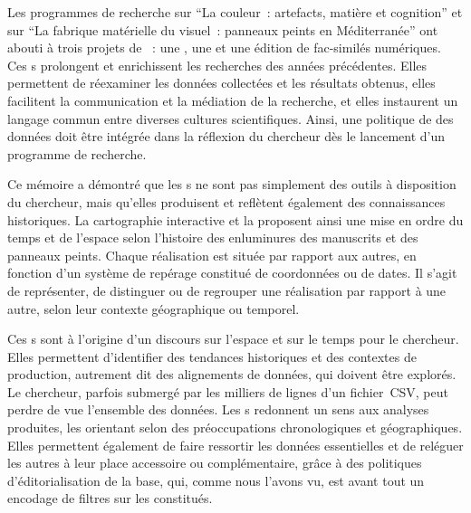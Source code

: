 Les programmes de recherche sur \enquote{La couleur~: artefacts, matière et cognition} et sur \enquote{La fabrique matérielle du visuel~: panneaux peints en Méditerranée} ont abouti à trois projets de ~: une , une  et une édition de fac-similés numériques. Ces s prolongent et enrichissent les recherches des années précédentes. Elles permettent de réexaminer les données collectées et les résultats obtenus, elles facilitent la communication et la médiation de la recherche, et elles instaurent un langage commun entre diverses cultures scientifiques. Ainsi, une politique de  des données doit être intégrée dans la réflexion du chercheur dès le lancement d’un programme de recherche.\\\par
Ce mémoire a démontré que les s ne sont pas simplement des outils à disposition du chercheur, mais qu'elles produisent et reflètent également des connaissances historiques. La cartographie interactive et la  proposent ainsi une mise en ordre du temps et de l’espace selon l’histoire des enluminures des manuscrits et des panneaux peints. Chaque réalisation est située par rapport aux autres, en fonction d’un système de repérage constitué de coordonnées ou de dates. Il s’agit de représenter, de distinguer ou de regrouper une réalisation par rapport à une autre, selon leur contexte géographique ou temporel.\par
Ces s sont à l’origine d’un discours sur l’espace et sur le temps pour le chercheur. Elles permettent d’identifier des tendances historiques et des contextes de production, autrement dit des alignements de données, qui doivent être explorés. Le chercheur, parfois submergé par les milliers de lignes d’un fichier~CSV, peut perdre de vue l’ensemble des données. Les s redonnent un sens aux analyses produites, les orientant selon des préoccupations chronologiques et géographiques. Elles permettent également de faire ressortir les données essentielles et de reléguer les autres à leur place accessoire ou complémentaire, grâce à des politiques d’éditorialisation de la base, qui, comme nous l’avons vu, est avant tout un encodage de filtres sur les  constitués.\par
